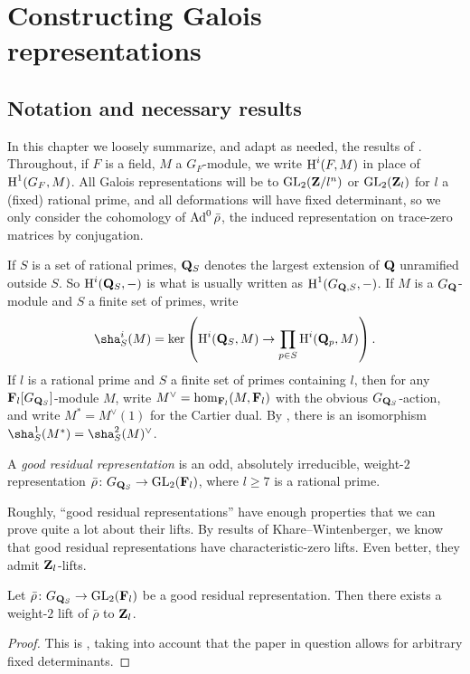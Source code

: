 
\chapter{Constructing Galois representations}





\section{Notation and necessary results}

In this chapter we loosely summarize, and adapt as needed, the results of 
\cite{khare-larsen-ramakrishna-2005,pande-2011}. Throughout, if $F$ is a field, 
$M$ a $G_F$-module, we write $\operatorname{H}^i(F,M)$ in place of $\operatorname{H}^1(G_F,M)$. All Galois 
representations will be to $\operatorname{GL}_2(\mathbf{Z}/l^n)$ or $\operatorname{GL}_2(\mathbf{Z}_l)$ for $l$ a (fixed) 
rational prime, and all deformations will have fixed determinant, so we only 
consider the cohomology of $\operatorname{Ad}^0\bar\rho$, the induced representation on 
trace-zero matrices by conjugation. 

If $S$ is a set of rational primes, $\mathbf{Q}_S$ denotes the largest extension of 
$\mathbf{Q}$ unramified outside $S$. So $\operatorname{H}^i(\mathbf{Q}_S,-)$ is what is usually written as 
$\operatorname{H}^1(G_{\mathbf{Q},S},-)$. If $M$ is a $G_{\mathbf{Q}}$-module and $S$ a finite set of primes, 
write 
\[
	\sha^i_S(M) = \ker\left( \h^i(\bQ_S,M) \to \prod_{p\in S} \h^i(\bQ_p,M)\right) .
\]
If $l$ is a rational prime and $S$ a finite set of primes containing $l$, then 
for any $\mathbf{F}_l[G_{\mathbf{Q}_S}]$-module $M$, write $M^\vee=\hom_{\mathbf{F}_l}(M,\mathbf{F}_l)$ 
with the obvious $G_{\mathbf{Q}_S}$-action, and write $M^\ast = M^\vee(1)$ for the 
Cartier dual. By \cite[Th.~8.6.7]{neukirch-schmidt-winberg-2008}, there is an 
isomorphism $\sha^1_S(M^\ast) = \sha_S^2(M)^\vee$. 

\begin{definition}
A \emph{good residual representation} is an odd, absolutely irreducible, 
weight-$2$ representation $\bar\rho\colon G_{\mathbf{Q}_S} \to \operatorname{GL}_2(\mathbf{F}_l)$, where 
$l\geqslant 7$ is a rational prime. 
\end{definition}

Roughly, ``good residual representations'' have enough properties that we can 
prove quite a lot about their lifts. By results of Khare--Wintenberger, we know 
that good residual representations have characteristic-zero lifts. Even better, 
they admit $\mathbf{Z}_l$-lifts. 

\begin{theorem}\label{thm:always-can-lift}
Let $\bar\rho\colon G_{\mathbf{Q}_S} \to \operatorname{GL}_2(\mathbf{F}_l)$ be a good residual 
representation. Then there exists a weight-$2$ lift of $\bar\rho$ to $\mathbf{Z}_l$. 
\end{theorem}
\begin{proof}
This is \cite[Th.~1]{ramakrishna-2002}, taking into account that the paper in 
question allows for arbitrary fixed determinants. 
\end{proof}

